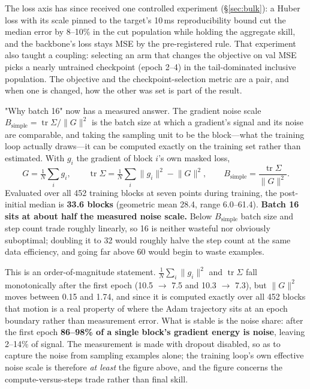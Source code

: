 \documentclass[10pt]{article}
\begin{document}
The loss axis has since received one controlled experiment (\S\ref{sec:bulk}): a
Huber loss with its scale pinned to the target's 10\,ms reproducibility bound cut the
median error by 8--10\% in the cut population while holding the aggregate skill, and
the backbone's loss stays MSE by the pre-registered rule. That experiment also taught
a coupling: selecting an arm that changes the objective on val MSE picks a nearly
untrained checkpoint (epoch 2--4) in the tail-dominated inclusive population. The
objective and the checkpoint-selection metric are a pair, and when one is changed,
how the other was set is part of the result.

"Why batch 16" now has a measured answer. The gradient noise scale
$B_\mathrm{simple} = \operatorname{tr}\Sigma / \lVert G\rVert^2$ is the batch size at
which a gradient's signal and its noise are comparable, and taking the sampling unit to
be the block---what the training loop actually draws---it can be computed exactly on the
training set rather than estimated. With $g_i$ the gradient of block $i$'s own masked
loss,
%
\begin{equation}
  G = \tfrac{1}{N}\sum_i g_i,\qquad
  \operatorname{tr}\Sigma = \tfrac{1}{N}\sum_i \lVert g_i\rVert^2 - \lVert G\rVert^2,\qquad
  B_\mathrm{simple} = \frac{\operatorname{tr}\Sigma}{\lVert G\rVert^2}.
  \label{eq:bsimple}
\end{equation}
%
Evaluated over all 452 training blocks at seven points during training, the post-initial
median is \textbf{33.6 blocks} (geometric mean 28.4, range 6.0--61.4). \textbf{Batch 16
sits at about half the measured noise scale.} Below $B_\mathrm{simple}$ batch size and
step count trade roughly linearly, so 16 is neither wasteful nor obviously suboptimal;
doubling it to 32 would roughly halve the step count at the same data efficiency, and
going far above 60 would begin to waste examples.

This is an order-of-magnitude statement. $\frac{1}{N}\sum_i\lVert g_i\rVert^2$ and
$\operatorname{tr}\Sigma$ fall monotonically after the first epoch (10.5 $\rightarrow$ 7.5
and 10.3 $\rightarrow$ 7.3), but $\lVert G\rVert^2$ moves between 0.15 and 1.74, and since
it is computed exactly over all 452 blocks that motion is a real property of where the
Adam trajectory sits at an epoch boundary rather than measurement error. What is stable is
the noise share: after the first epoch \textbf{86--98\% of a single block's gradient energy
is noise}, leaving 2--14\% of signal. The measurement is made with dropout disabled, so as
to capture the noise from sampling examples alone; the training loop's own effective noise
scale is therefore \emph{at least} the figure above, and the figure concerns the
compute-versus-steps trade rather than final skill.
\end{document}
